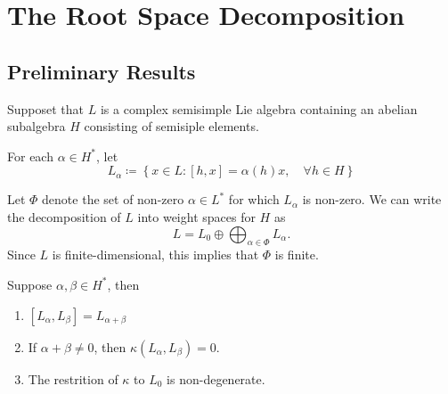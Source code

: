 \documentclass[../main.tex]{subfiles}
\begin{document}
\ifSubfilesClassLoaded{

    
}{}

\chapter{ The Root Space Decomposition }
\section{Preliminary Results}

\begin{proposition}{}{}
    Supposet that \(  L  \) is a complex semisimple Lie algebra containing an abelian subalgebra \(  H  \) consisting of semisiple elements. 
    
    For each \(  \alpha  \in H^{*}  \), let \[
    L_{\alpha }\coloneqq \left\{ x \in L: \left[ h,x \right]= \alpha \left( h \right)x,\quad \forall h\in H   \right\}
    \] 
    
    Let $\Phi$ denote the set of non-zero $\alpha \in L^*$ for which $L_\alpha$ is non-zero. We can write the decomposition of $L$ into weight spaces for $H$ as
\begin{equation}
L = L_0 \oplus \bigoplus_{\alpha \in \Phi} L_\alpha. \tag{\(\star\)}
\end{equation}
Since $L$ is finite-dimensional, this implies that $\Phi$ is finite.

\end{proposition}

\begin{lemma}{}{}
    Suppose \(  \alpha , \beta \in H^{*}  \), then
    \begin{enumerate}
        \item \(  \left[ L_{\alpha },L_{\beta } \right]= L_{\alpha + \beta }   \)
        \item If \(  \alpha + \beta \neq 0  \), then \(   \kappa \left( L_{\alpha },L_{\beta } \right)= 0   \).
        \item The restrition of \(   \kappa   \) to \(  L_0  \) is non-degenerate.     
    \end{enumerate}
     
\end{lemma}
\end{document}
